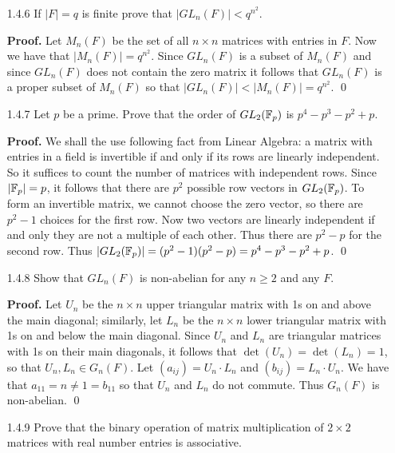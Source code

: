 \begin{enumerate}
      ($\Rightarrow$) We shall instead prove the contrapositive in this
      direction. Let $M(a) = (a_{ij})$ denote the $n \times n$ diagonal matrix 
      where $a_{11} = a$ and $a_{ii} = 1$, for $1 < i \le n$. Hence
      det$(M(a)) = a$. So suppose $F$ is infinite (so that $F^\times$ is also
      infinite), then the set $\left\{M(a) : a \in F^\times\right\}$ is not only 
      infinite but also a subset of $GL_n(F)$. Thus $GL_n(F)$ is infinite, as 
      desired. \qed
   \item[1.4.6]   If $|F| = q$ is finite prove that $|GL_n(F)| < q^{n^2}$.
   
      \textbf{Proof.} Let $M_n(F)$ be the set of all $n \times n$ matrices with
      entries in $F$. Now we have that $|M_n(F)| = q^{n^2}$. Since $GL_n(F)$ is
      a subset of $M_n(F)$ and since $GL_n(F)$ does not contain the zero matrix
      it follows that $GL_n(F)$ is a proper subset of $M_n(F)$ so that
      $|GL_n(F)| < |M_n(F)| = q^{n^2}$. \qed
   \item[1.4.7]   Let $p$ be a prime. Prove that the order of $GL_2(\mathbb{F}_p)$ is
                  $p^4 - p^3 - p^2 + p$.
                  
      \textbf{Proof.} We shall the use following fact from Linear Algebra: a
      matrix with entries in a field is invertible if and only if its rows are
      linearly independent. So it suffices to count the number of matrices with
      independent rows. Since $|\mathbb{F}_p| = p$, it follows that there are $p^2$
      possible row vectors in $GL_2(\mathbb{F}_p)$. To form an invertible matrix, we
      cannot choose the zero vector, so there are $p^2 - 1$ choices for the
      first row.  Now two vectors are linearly independent if and only they are
      not a multiple of each other. Thus there are $p^2 - p$ for the second row.
      Thus $|GL_2(\mathbb{F}_p)| = (p^2 - 1)(p^2 - p) = p^4 - p^3 - p^2 + p$. \qed
   \item[1.4.8]   Show that $GL_n(F)$ is non-abelian for any $n \ge 2$ and any
                  $F$.
                  
      \textbf{Proof.} Let $U_n$ be the $n \times n$ upper triangular matrix with
      1s on and above the main diagonal; similarly, let $L_n$ be the
      $n \times n$ lower triangular matrix with 1s on and below the main
      diagonal. Since $U_n$ and $L_n$ are triangular matrices with 1s on their
      main diagonals, it follows that $\det(U_n) = \det(L_n) = 1$, so that
      $U_n, L_n \in G_n(F)$. Let $(a_{ij}) = U_n \cdot L_n$ and
      $(b_{ij}) = L_n \cdot U_n$. We have that $a_{11} = n \neq 1 = b_{11}$ so
      that $U_n$ and $L_n$ do not commute. Thus $G_n(F)$ is non-abelian. \qed
   \item[1.4.9]   Prove that the binary operation of matrix multiplication of
                  $2 \times 2$ matrices with real number entries is associative.
                  

\end{enumerate}
